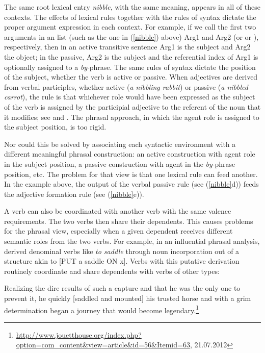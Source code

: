 \documentclass[output=paper
 	        ,biblatex
                ,babelshorthands
                ,newtxmath
                ,draftmode
                ,colorlinks, citecolor=brown
]{langscibook}
\begin{document}
The same root lexical entry \emph{nibble}, with the same meaning, appears in all of these contexts.
The effects of lexical rules together with the rules of syntax dictate the proper argument
expression in each context.  For example, if we call the first two arguments in an \argst list
(such as the one in (\ref{nibble}) above) Arg1 and Arg2 (or  or ), respectively, then in an active
transitive sentence Arg1 is the subject and Arg2 the object; in the passive, Arg2 is the subject and
the referential index of Arg1 is optionally assigned to a \emph{by}-phrase.  The same rules of
syntax dictate the position of the subject, whether the verb is active or passive.  When adjectives
are derived from verbal participles, whether active (\emph{a nibbling rabbit}) or passive (\emph{a
  nibbled carrot}), the rule is that whichever role would have been expressed as the subject of the
verb is assigned by the participial adjective to the referent of the noun that it modifies; see \citet{Bresnan:1982passive}\addpages
and \citet[Chapter~3]{Bresnan+etal:2015}.  
The phrasal approach, in which the agent role is assigned to the subject position, is too rigid.  

Nor could this be solved by associating each syntactic environment with a different meaningful phrasal construction: an active construction with agent role in the subject position, a passive construction with agent in the \textit{by}-phrase position, etc.  The problem for that view is that one lexical rule can feed another.  In the example above, the output of the verbal passive rule (see (\ref{nibble}d)) feeds the adjective formation rule (see (\ref{nibble}e)).  
 
A verb can also be coordinated with another verb with the same valence requirements.  The two verbs then share their dependents.  This causes problems for the phrasal view, especially when a given dependent receives different semantic roles from the two verbs.  For example, in an influential phrasal analysis, \citet{hale+keyser:1993}
derived denominal verbs like \textit{to saddle} through noun incorporation out of a structure akin to
[PUT a saddle ON x].  Verbs with this putative derivation routinely coordinate and share
dependents with verbs of other types: 

\begin{exe}
\ex Realizing the dire results of such a capture and that he was the only one to prevent it, he quickly
[saddled and mounted] his trusted horse and with a grim determination began a journey that would
become legendary.\footnote{\url{http://www.jouetthouse.org/index.php?option=com_content&view=article&id=56&Itemid=63},
  21.07.2012}  
\end{exe}
\end{document}
